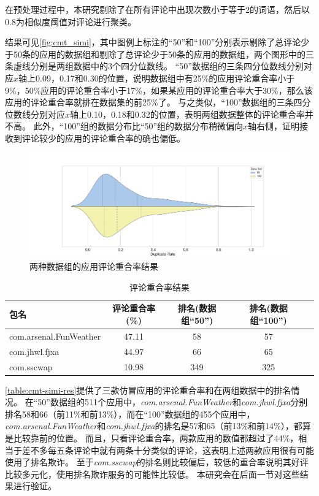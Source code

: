 在预处理过程中，本研究剔除了在所有评论中出现次数小于等于2的词语，然后以0.8为相似度阈值对评论进行聚类。

结果可见\autoref{fig:cmt_simi}，其中图例上标注的``50''和``100''分别表示剔除了总评论少于50条的应用的数据组和剔除了总评论少于50条的应用的数据组，两个图形中的三条虚线分别是两组数据中的3个四分位数线。
``50''数据组的三条四分位数线分别对应$x$轴上0.09，0.17和0.30的位置，说明数据组中有25\%的应用评论重合率小于9\%，50\%应用的评论重合率小于17\%，如果某应用的评论重合率大于30\%，那么该应用的评论重合率就排在数据集的前25\%了。
与之类似，``100''数据组的三条四分位数线分别对应$x$轴上0.10，0.18和0.32的位置，表明两组数据整体的评论重合率并不高。
此外，``100''组的数据分布比``50''组的数据分布稍微偏向$x$轴右侧，证明接收到评论较少的应用的评论重合率的确也偏低。

\begin{figure}[htbp]
	\centering
	\includegraphics[width=\textwidth]{./Figures/edwin-cmt-simi-dist.png}
    \caption{两种数据组的应用评论重合率结果}
    \label{fig:cmt_simi}
\end{figure}

\begin{table}[htbp]
	\renewcommand{\arraystretch}{1}
	\small
	\centering
	\caption{评论重合率结果}
	\vspace{1mm}
	\begin{tabular}{lcccc}
		\toprule
		包名 & 评论重合率(\%) & 排名(数据组``50'') & 排名(数据组``100'') \\
		\midrule
		com.arsenal.FunWeather & 47.11 & 58 & 57 \\
		\rowcolor{gray!15} com.jhwl.fjxa & 44.97 & 66 & 65 \\
		com.sscwap & 10.98 & 349 & 325 \\
		\bottomrule
	\end{tabular}
	\label{table:cmt-simi-res}
\end{table}

\autoref{table:cmt-simi-res}提供了三款仿冒应用的评论重合率和在两组数据中的排名情况。
在``50''数据组的511个应用中，\emph{com.arsenal.FunWeather}和\emph{com.jhwl.fjxa}分别排名58和66（前11\%和前13\%），而在``100''数据组的455个应用中，\emph{com.arsenal.FunWeather}和\emph{com.jhwl.fjxa}的排名是57和65（前13\%和前14\%），都算是比较靠前的位置。
而且，只看评论重合率，两款应用的数值都超过了44\%，相当于差不多每五条评论中就有两条十分类似的评论，这表明上述两款应用很有可能使用了排名欺诈。
至于\emph{com.sscwap}的排名则比较偏后，较低的重合率说明其好评比较多元化，使用排名欺诈服务的可能性比较低。
本研究会在后面一节对这些结果进行验证。

